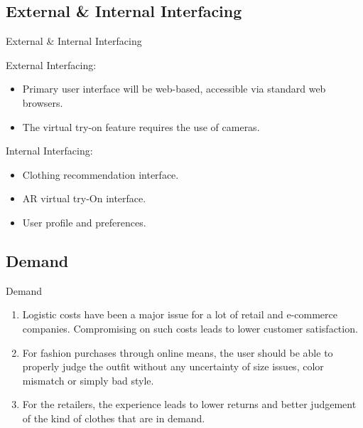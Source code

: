 \subsection{External \& Internal Interfacing}
\begin{frame}{External \& Internal Interfacing}
	\begin{multicols}{2}
		External Interfacing:
		\begin{itemize}
			\item Primary user interface will be web-based, accessible via standard web browsers.
			\item The virtual try-on feature requires the use of cameras.
		\end{itemize}

		\break

		Internal Interfacing:
		\begin{itemize}
			\item Clothing recommendation interface.
			\item AR virtual try-On interface.
			\item User profile and preferences.
		\end{itemize}
	\end{multicols}
\end{frame}

\subsection{Demand}
\begin{frame}{Demand}
	\begin{enumerate}
		\item Logistic costs have been a major issue for a lot of retail and e-commerce companies. Compromising on such costs leads to lower customer satisfaction.
		\item For fashion purchases through online means, the user should be able to properly judge the outfit without any uncertainty of size issues, color mismatch or simply bad style.
		\item For the retailers, the experience leads to lower returns and better judgement of the kind of clothes that are in demand.
	\end{enumerate}
\end{frame}

